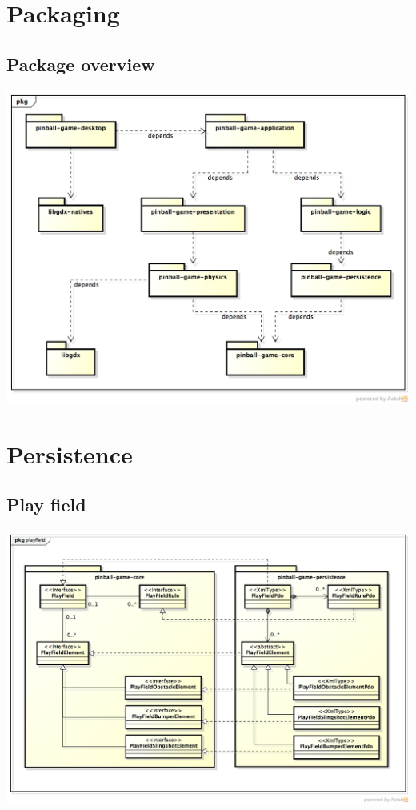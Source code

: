 \documentclass[fontsize=12pt,
               paper=a4,
               twoside=false,
               parskip=half,
               ]{scrartcl}
\begin{document}
\newcommand{\doctitle}{Design Model}


\tableofcontents

\section{Packaging}
\subsection{Package overview}
\includegraphics[width=15.5cm]{./img/package-overview.png}

\section{Persistence}

\subsection{Play field}
\includegraphics[width=15.5cm]{./img/persistence-playfield.png}
\end{document}
